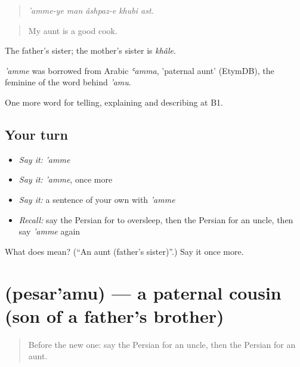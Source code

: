 \begin{quote}
\emph{'amme-ye man âshpaz-e khubi ast.}
\end{quote}

\begin{quote}
My aunt is a good cook.
\end{quote}

The father's sister; the mother's sister is \emph{khâle}.

\begin{cousinweb}
\emph{'amme} was borrowed from Arabic \emph{ʿamma}, 'paternal aunt' (EtymDB), the feminine of the word behind \emph{'amu}.
\end{cousinweb}

\begin{grammarlens}[title={What you've built}]
One more word for telling, explaining and describing at B1.
\end{grammarlens}

\subsection*{Your turn}
\begin{itemize}
\raggedright
  \item \emph{Say it:} \emph{'amme}
  \item \emph{Say it:} \emph{'amme}, once more
  \item \emph{Say it:} a sentence of your own with \emph{'amme}
  \item \emph{Recall:} say the Persian for to oversleep, then the Persian for an uncle, then say \emph{'amme} again
\end{itemize}

\begin{tcolorbox}[breakable,colback=teal!4,colframe=teal!35!black,title={Before you move on}]
What does  mean? (\textquotedblleft{}An aunt (father's sister)\textquotedblright{}.) Say it once more.
\end{tcolorbox}
\section[\texorpdfstring{\fa{پسرعمو} (pesar'amu)}{پسرعمو (pesar'amu)}]{ (pesar'amu) — a paternal cousin (son of a father's brother)}

\label{lesson:FA-C500-pesaramu}



\begin{quote}
Before the new one: say the Persian for an uncle, then the Persian for an aunt.
\end{quote}

